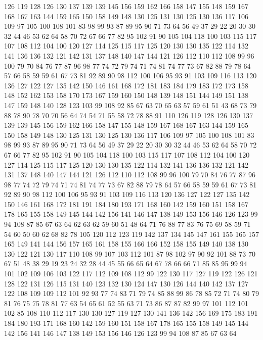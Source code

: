 126 119 128 126 130 137 139 139 145 156 159 162 166 158 147 155 148 159 167 168
167 163 144 159 165 150 158 149 148 130 125 131 130 125 130 136 117 106 109 97
105 100 108 101 83 98 99 93 87 89 95 90 71 73 64 56 49 37 29 22
20 30 30 32 44 46 53 62 64 58 70 72 67 66 77 82 95 102 91 90
105 104 118 100 103 115 117 107 108 112 104 100 120 127 114 125 115 117 125 120
130 130 135 122 114 132 141 136 136 132 121 142 131 137 148 140 147 144 121 126
112 110 112 108 99 96 100 79 70 84 76 77 87 96 98 77 74 72 79 74
71 74 81 74 77 73 67 82 88 79 78 64 57 66 58 59 59 61 67 73
81 92 89 90 98 112 100 106 95 93 91 103 109 116 113 120 136 127 122 127
135 142 150 146 161 168 172 181 183 184 179 183 172 173 158 148 152 162 153 158
170 173 167 159 160 150 148 139 148 151 144 149 151 138 147 159 148 140 128 123
103 99 108 92 85 67 63 70 65 63 57 59 61 51 43 68 73 79 88 78
90 78 70 70 56 64 74 54 71 55 58 72 78 88 91 110 126 119 128 126
130 137 139 139 145 156 159 162 166 158 147 155 148 159 167 168 167 163 144 159
165 150 158 149 148 130 125 131 130 125 130 136 117 106 109 97 105 100 108 101
83 98 99 93 87 89 95 90 71 73 64 56 49 37 29 22 20 30 30 32
44 46 53 62 64 58 70 72 67 66 77 82 95 102 91 90 105 104 118 100
103 115 117 107 108 112 104 100 120 127 114 125 115 117 125 120 130 130 135 122
114 132 141 136 136 132 121 142 131 137 148 140 147 144 121 126 112 110 112 108
99 96 100 79 70 84 76 77 87 96 98 77 74 72 79 74 71 74 81 74
77 73 67 82 88 79 78 64 57 66 58 59 59 61 67 73 81 92 89 90
98 112 100 106 95 93 91 103 109 116 113 120 136 127 122 127 135 142 150 146
161 168 172 181 191 184 180 193 171 168 160 142 159 160 151 158 167 178 165 155
158 149 145 144 142 156 141 146 147 138 149 153 156 146 126 123 99 94 108 87
85 67 63 64 62 63 62 59 60 51 48 64 71 76 88 77 83 76 75 69
58 59 71 54 60 50 60 62 68 82 78 105 120 112 123 119 142 137 134 145
147 161 155 165 157 165 149 141 144 156 157 165 161 158 155 166 166 152 158 155
149 140 138 130 130 122 121 130 117 110 108 99 107 103 112 101 87 98 102 97
90 92 101 88 73 70 67 51 48 38 29 19 23 24 32 28 44 45 55 66
65 64 67 78 66 66 71 85 85 95 99 94 101 102 109 106 103 122 117 112
109 108 112 99 122 130 117 127 119 122 126 121 128 122 131 126 115 131 140 123
132 130 124 147 130 126 144 140 142 137 127 122 108 109 109 112 101 92 93 77
74 83 71 79 74 85 88 99 86 78 85 72 71 74 80 79 81 76 75 75
78 81 77 63 54 65 61 52 55 63 71 73 86 87 87 82 99 97 101 112
101 102 85 108 110 112 117 130 130 127 119 127 130 141 136 142 156 169 175 183
191 184 180 193 171 168 160 142 159 160 151 158 167 178 165 155 158 149 145 144
142 156 141 146 147 138 149 153 156 146 126 123 99 94 108 87 85 67 63 64
